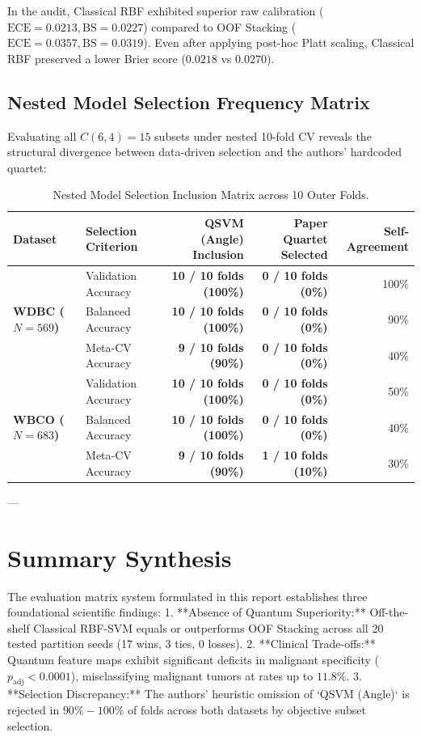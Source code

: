 \documentclass[11pt,a4paper]{article}
\begin{document}
In the audit, Classical RBF exhibited superior raw calibration ($\text{ECE} = 0.0213, \text{BS} = 0.0227$) compared to OOF Stacking ($\text{ECE} = 0.0357, \text{BS} = 0.0319$). Even after applying post-hoc Platt scaling, Classical RBF preserved a lower Brier score ($0.0218$ vs $0.0270$).

\subsection{Nested Model Selection Frequency Matrix}

Evaluating all $C(6, 4) = 15$ subsets under nested 10-fold CV reveals the structural divergence between data-driven selection and the authors' hardcoded quartet:

\begin{table}[H]
\centering
\small
\caption{Nested Model Selection Inclusion Matrix across 10 Outer Folds.}
\label{tab:selection_matrix}
\begin{tabularx}{\textwidth}{llrrr}
\toprule
\textbf{Dataset} & \textbf{Selection Criterion} & \textbf{QSVM (Angle) Inclusion} & \textbf{Paper Quartet Selected} & \textbf{Self-Agreement} \\
\midrule
\multirow{3}{*}{\textbf{WDBC ($N=569$)}} 
& Validation Accuracy & \textbf{10 / 10 folds (100\%)} & \textbf{0 / 10 folds (0\%)} & 100\% \\
& Balanced Accuracy & \textbf{10 / 10 folds (100\%)} & \textbf{0 / 10 folds (0\%)} & 90\% \\
& Meta-CV Accuracy & \textbf{9 / 10 folds (90\%)} & \textbf{0 / 10 folds (0\%)} & 40\% \\
\midrule
\multirow{3}{*}{\textbf{WBCO ($N=683$)}} 
& Validation Accuracy & \textbf{10 / 10 folds (100\%)} & \textbf{0 / 10 folds (0\%)} & 50\% \\
& Balanced Accuracy & \textbf{10 / 10 folds (100\%)} & \textbf{0 / 10 folds (0\%)} & 40\% \\
& Meta-CV Accuracy & \textbf{9 / 10 folds (90\%)} & \textbf{1 / 10 folds (10\%)} & 30\% \\
\bottomrule
\end{tabularx}
\end{table}

---

\section{Summary Synthesis}

The evaluation matrix system formulated in this report establishes three foundational scientific findings:
1. **Absence of Quantum Superiority:** Off-the-shelf Classical RBF-SVM equals or outperforms OOF Stacking across all 20 tested partition seeds (17 wins, 3 ties, 0 losses).
2. **Clinical Trade-offs:** Quantum feature maps exhibit significant deficits in malignant specificity ($p_{\text{adj}} < 0.0001$), misclassifying malignant tumors at rates up to $11.8\%$.
3. **Selection Discrepancy:** The authors' heuristic omission of `QSVM (Angle)` is rejected in $90\% - 100\%$ of folds across both datasets by objective subset selection.
\end{document}
